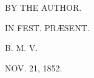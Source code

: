 BY THE AUTHOR.





IN FEST. PRÆSENT. 

B. M. V.

NOV. 21, 1852.








\begin{quote}



\begin{quote}



\begin{quote}



\begin{quote}



\begin{quote}



































\end{quote}



\end{quote}



\end{quote}



\end{quote}



\end{quote}











